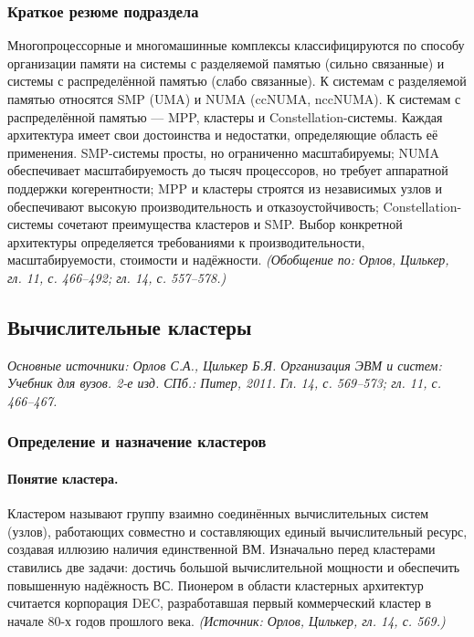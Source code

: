 \documentclass[a4paper,12pt]{article}
\begin{document}
\subsubsection{Краткое резюме подраздела}
Многопроцессорные и многомашинные комплексы классифицируются по способу организации памяти на системы с разделяемой памятью (сильно связанные) и системы с распределённой памятью (слабо связанные). К системам с разделяемой памятью относятся SMP (UMA) и NUMA (ccNUMA, nccNUMA). К системам с распределённой памятью — MPP, кластеры и Constellation-системы. Каждая архитектура имеет свои достоинства и недостатки, определяющие область её применения. SMP-системы просты, но ограниченно масштабируемы; NUMA обеспечивает масштабируемость до тысяч процессоров, но требует аппаратной поддержки когерентности; MPP и кластеры строятся из независимых узлов и обеспечивают высокую производительность и отказоустойчивость; Constellation-системы сочетают преимущества кластеров и SMP. Выбор конкретной архитектуры определяется требованиями к производительности, масштабируемости, стоимости и надёжности.
\textit{(Обобщение по: Орлов, Цилькер, гл. 11, с. 466--492; гл. 14, с. 557--578.)}

\subsection{Вычислительные кластеры}

\noindent\textit{Основные источники: Орлов С.А., Цилькер Б.Я. Организация ЭВМ и систем: Учебник для вузов. 2-е изд. СПб.: Питер, 2011. Гл. 14, с. 569--573; гл. 11, с. 466--467.}

\subsubsection{Определение и назначение кластеров}

\paragraph{Понятие кластера.}
Кластером называют группу взаимно соединённых вычислительных систем (узлов), работающих совместно и составляющих единый вычислительный ресурс, создавая иллюзию наличия единственной ВМ. Изначально перед кластерами ставились две задачи: достичь большой вычислительной мощности и обеспечить повышенную надёжность ВС. Пионером в области кластерных архитектур считается корпорация DEC, разработавшая первый коммерческий кластер в начале 80-х годов прошлого века.
\textit{(Источник: Орлов, Цилькер, гл. 14, с. 569.)}
\end{document}
